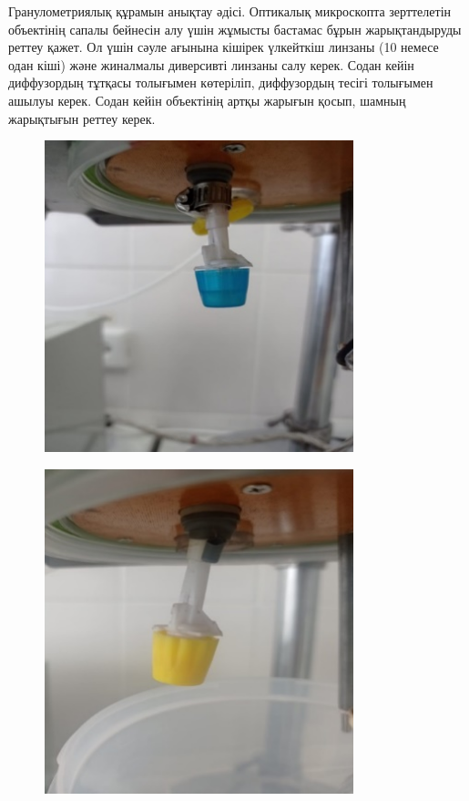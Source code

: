 \begin{multicols}{2}
Гранулометриялық құрамын анықтау әдісі. Оптикалық микроскопта
зерттелетін объектінің сапалы бейнесін алу үшін жұмысты бастамас бұрын
жарықтандыруды реттеу қажет. Ол үшін сәуле ағынына кішірек үлкейткіш
линзаны (10 немесе одан кіші) және жиналмалы диверсивті линзаны салу
керек. Содан кейін диффузордың тұтқасы толығымен көтеріліп, диффузордың
тесігі толығымен ашылуы керек. Содан кейін объектінің артқы жарығын
қосып, шамның жарықтығын реттеу керек.
\end{multicols}


\begin{figure}[H]
	\centering
	\includegraphics[width=0.8\textwidth]{media/pish/image20}
	\caption*{}
\end{figure}


\begin{figure}[H]
	\centering
	\includegraphics[width=0.8\textwidth]{media/pish/image21}
	\caption*{}
\end{figure}


